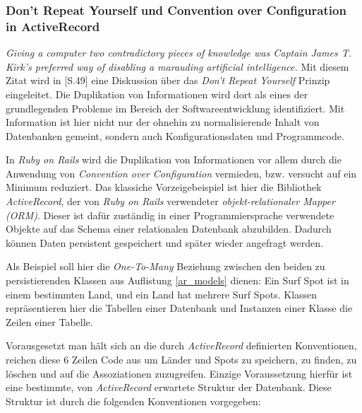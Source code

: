 \subsubsection{Don't Repeat Yourself und Convention over Configuration
  in ActiveRecord}

\textit{Giving a computer two contradictory pieces of knowledge was
  Captain James T. Kirk's preferred way of disabling a marauding
  artificial intelligence.} Mit diesem Zitat wird in
\cite{hunt1999}[S.49] eine Diskussion über das \textit{Don't Repeat
  Yourself} Prinzip eingeleitet. Die Duplikation von Informationen
wird dort als eines der grundlegenden Probleme im Bereich der
Softwareentwicklung identifiziert. Mit Information ist hier nicht nur
der ohnehin zu normalisierende Inhalt von Datenbanken gemeint, sondern
auch Konfigurationsdaten und Programmcode.

In \textit{Ruby on Rails} wird die Duplikation von Informationen vor
allem durch die Anwendung von \textit{Convention over Configuration}
vermieden, bzw. versucht auf ein Minimum reduziert. Das klassiche
Vorzeigebeispiel ist hier die Bibliothek \textit{ActiveRecord}, der
von \textit{Ruby on Rails} verwendeter \textit{objekt-relationaler
  Mapper (ORM)}. Dieser ist dafür zuständig in einer
Programmiersprache verwendete Objekte auf das Schema einer
relationalen Datenbank abzubilden. Dadurch können Daten persistent
gespeichert und später wieder angefragt werden.

Als Beispiel soll hier die \textit{One-To-Many} Beziehung zwischen den
beiden zu persistierenden Klassen aus Auflistung \ref{ar_models}
dienen: Ein Surf Spot ist in einem bestimmten Land, und ein Land hat
mehrere Surf Spots. Klassen repräsentieren hier die Tabellen einer
Datenbank und Instanzen einer Klasse die Zeilen einer Tabelle.



Vorausgesetzt man hält sich an die durch \textit{ActiveRecord}
definierten Konventionen, reichen diese 6 Zeilen Code aus um Länder
und Spots zu speichern, zu finden, zu löschen und auf die
Assoziationen zuzugreifen. Einzige Voraussetzung hierfür ist eine
bestimmte, von \textit{ActiveRecord} erwartete Struktur der
Datenbank. Diese Struktur ist durch die folgenden Konventionen
vorgegeben:

